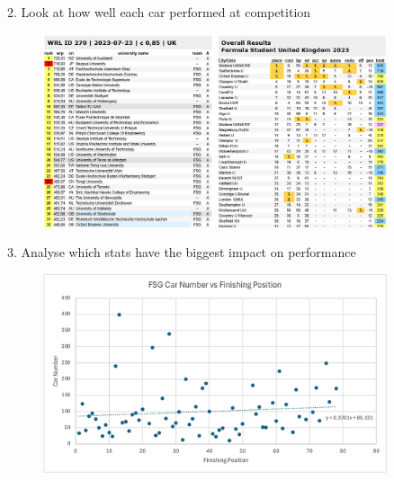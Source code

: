 \begin{frame}
    \begin{center}
        2. Look at how well each car performed at competition
        \begin{figure}
            \includegraphics[width=0.9\textwidth]{res/FS World Ranking.png}
        \end{figure}
    \end{center}
\end{frame}

\begin{frame}
    \begin{center}
        3. Analyse which stats have the biggest impact on performance
        \begin{figure}
            \includegraphics[width=0.9\textwidth]{res/Car Number vs Finishing Position.png}
        \end{figure}
    \end{center}
\end{frame}


